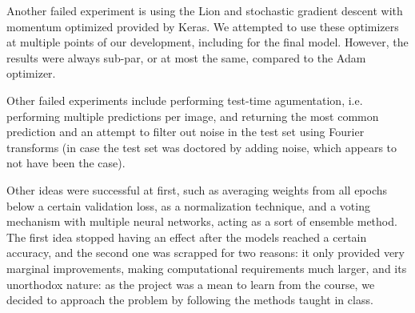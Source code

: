 \documentclass[11pt]{article}
\begin{document}
\begin{multicols}{2}
      Another failed experiment is using the Lion and stochastic gradient descent
      with momentum optimized provided by Keras. We attempted to use these optimizers
      at multiple points of our development, including for the final model. However,
      the results were always sub-par, or at most the same, compared to the Adam 
      optimizer.

      Other failed experiments include performing test-time agumentation, i.e. 
      performing multiple predictions per image, and returning the most common prediction 
      and an attempt to filter out noise in the test set using Fourier transforms (in case
      the test set was doctored by adding noise, which appears to not have been the case).

      Other ideas were successful at first, such as averaging weights from all epochs 
      below a certain validation loss, as a normalization technique, and a voting mechanism 
      with multiple neural networks, acting as a sort of ensemble method. The first idea
      stopped having an effect after the models reached a certain accuracy, and the second
      one was scrapped for two reasons: it only provided very marginal improvements, 
      making computational requirements much larger, and its unorthodox nature: as the 
      project was a mean to learn from the course, we decided to approach the problem by 
      following the methods taught in class.




\end{multicols}
\end{document}
